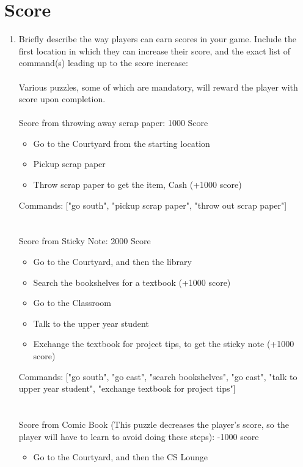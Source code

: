 \documentclass[11pt]{article}
\begin{document}
\section*{Score}
\begin{enumerate}

    \item Briefly describe the way players can earn scores in your game. Include the first location in which they can increase their score, and the exact list of command(s) leading up to the score increase:\\\\
Various puzzles, some of which are mandatory, will reward the player with score upon completion. \\\\
Score from throwing away scrap paper: 1000 Score
        \begin{itemize}
            \item Go to the Courtyard from the starting location
            \item Pickup scrap paper
            \item Throw scrap paper to get the item, Cash (+1000 score)
        \end{itemize}
Commands: ["go south", "pickup scrap paper", "throw out scrap paper"]
\\\\\\
Score from Sticky Note: 2000 Score
        \begin{itemize}
            \item Go to the Courtyard, and then the library
            \item Search the bookshelves for a textbook (+1000 score)
            \item Go to the Classroom
            \item Talk to the upper year student
            \item Exchange the textbook for project tips, to get the sticky note (+1000 score)
        \end{itemize}
Commands: ["go south", "go east", "search bookshelves", "go east", "talk to upper year student", "exchange textbook for project tips"]
\\\\\\
Score from Comic Book (This puzzle decreases the player's score, so the player will have to learn to avoid doing these steps): -1000 score
        \begin{itemize}
            \item Go to the Courtyard, and then the CS Lounge

\end{itemize}
\end{enumerate}
\end{document}
